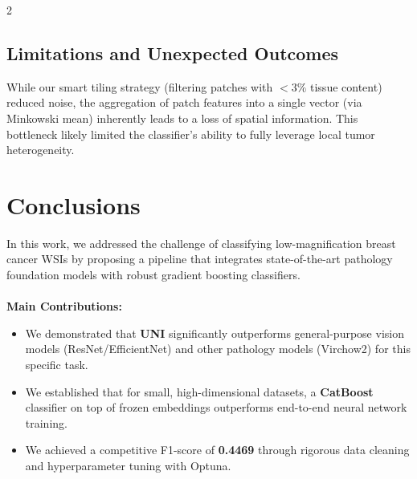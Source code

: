 \documentclass[11pt]{article}
\begin{document}
\begin{multicols}{2}
        \subsection{Limitations and Unexpected Outcomes}
        While our smart tiling strategy (filtering patches with $<3\%$ tissue content) reduced noise, the aggregation of patch features into a single vector (via Minkowski mean) inherently leads to a loss of spatial information. This bottleneck likely limited the classifier's ability to fully leverage local tumor heterogeneity.

        \section{Conclusions}
        In this work, we addressed the challenge of classifying low-magnification breast cancer WSIs by proposing a pipeline that integrates state-of-the-art pathology foundation models with robust gradient boosting classifiers.
        \\\\
        \textbf{Main Contributions:}
        \begin{itemize}
            \item We demonstrated that \textbf{UNI} significantly outperforms general-purpose vision models (ResNet/EfficientNet) and other pathology models (Virchow2) for this specific task.
            \item We established that for small, high-dimensional datasets, a \textbf{CatBoost} classifier on top of frozen embeddings outperforms end-to-end neural network training.
            \item We achieved a competitive F1-score of \textbf{0.4469} through rigorous data cleaning and hyperparameter tuning with Optuna.
        \end{itemize}

        
        
    
    \end{multicols}
\end{document}
